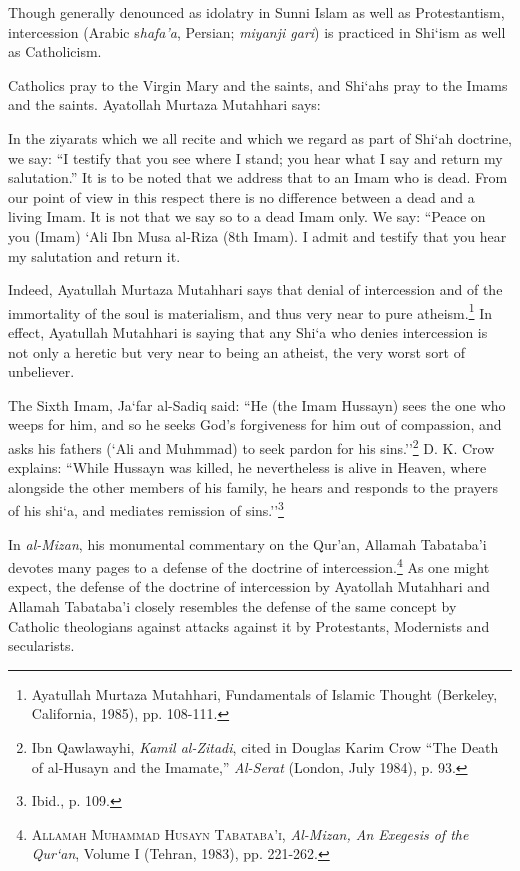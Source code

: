 Though generally denounced as idolatry in Sunni Islam as well as Protestantism, intercession (Arabic s\emph{hafa'a}, Persian; \emph{miyanji gari}) is practiced in Shi`ism as well as Catholicism.

Catholics pray to the Virgin Mary and the saints, and Shi`ahs pray to the Imams and the saints. Ayatollah Murtaza Mutahhari says:

\begin{quotex}
In the ziyarats which we all recite and which we regard as part of Shi`ah doctrine, we say: ``I testify that you see where I stand; you hear what I say and return my salutation.'' It is to be noted that we address that to an Imam who is dead. From our point of view in this respect there is no difference between a dead and a living Imam. It is not that we say so to a dead Imam only. We say: ``Peace on you (Imam) `Ali Ibn Musa al-Riza (8th Imam). I admit and testify that you hear my salutation and return it.
\end{quotex}


Indeed, Ayatullah Murtaza Mutahhari says that denial of intercession and of the immortality of the soul is materialism, and thus very near to pure atheism.\footnote{Ayatullah Murtaza Mutahhari, Fundamentals of Islamic Thought (Berkeley, California, 1985), pp. 108-111.} In effect, Ayatullah Mutahhari is saying that any Shi`a who denies intercession is not only a heretic but very near to being an atheist, the very worst sort of unbeliever.

The Sixth Imam, Ja`far al-Sadiq said: ``He (the Imam Hussayn) sees the one who weeps for him, and so he seeks God's forgiveness for him out of compassion, and asks his fathers (`Ali and Muhmmad) to seek pardon for his sins.''\footnote{Ibn Qawlawayhi, \emph{Kamil al-Zitadi}, cited in Douglas Karim Crow ``The Death of al-Husayn and the Imamate,'' \emph{Al-Serat} (London, July 1984), p. 93.} D. K. Crow explains: ``While Hussayn was killed, he nevertheless is alive in Heaven, where alongside the other members of his family, he hears and responds to the prayers of his shi`a, and mediates remission of sins.''\footnote{Ibid., p. 109.}

In \emph{al-Mizan}, his monumental commentary on the Qur'an, Allamah Tabataba'i devotes many pages to a defense of the doctrine of intercession.\footnote{\textsc{Allamah Muhammad Husayn Tabataba'i}, \emph{Al-Mizan, An Exegesis of the Qur`an}, Volume I (Tehran, 1983), pp. 221-262.} As one might expect, the defense of the doctrine of intercession by Ayatollah Mutahhari and Allamah Tabataba'i closely resembles the defense of the same concept by Catholic theologians against attacks against it by Protestants, Modernists and secularists.

